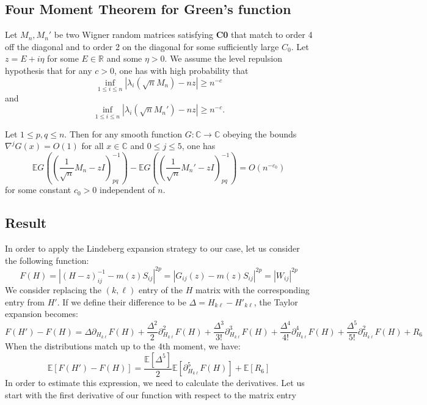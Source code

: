 \documentclass[11pt]{article}
\begin{document}
\subsection{Four Moment Theorem for Green's function}
 Let $M_n, M_n'$ be two Wigner random matrices satisfying \textbf{C0} that match to order 4 off the diagonal and to order 2 on the diagonal for some sufficiently large $C_0$. Let $z = E + i\eta$ for some $E \in \mathbb{R}$ and some $\eta > 0$. We assume the level repulsion hypothesis that for any $c > 0$, one has with high probability that
\begin{equation}
    \inf_{1 \leq i \leq n} |\lambda_i(\sqrt{n}M_n) - nz| \geq n^{-c}
\end{equation}
and
\begin{equation}
    \inf_{1 \leq i \leq n} |\lambda_i(\sqrt{n}M_n') - nz| \geq n^{-c}.
\end{equation}

Let $1 \leq p,q \leq n$. Then for any smooth function $G: \mathbb{C} \to \mathbb{C}$ obeying the bounds $\nabla^j G(x) = O(1)$ for all $x \in \mathbb{C}$ and $0 \leq j \leq 5$, one has
\begin{equation}
    \mathbb{E} G \left( \left( \frac{1}{\sqrt{n}} M_n - zI \right)^{-1}_{pq} \right)
    - \mathbb{E} G \left( \left( \frac{1}{\sqrt{n}} M_n' - zI \right)^{-1}_{pq} \right)
    = O(n^{-c_0})
\end{equation}
for some constant $c_0 > 0$ independent of $n$.



\subsection{Result}
In order to apply the Lindeberg expansion strategy to our case, let us consider the following function: $$F(H) = \left\vert
(H-z)_{ij}^{-1} - m(z)S_{ij}
\right\vert ^{2p} = \left\vert 
G_{ij}(z)-m(z)S_{ij}
\right\vert ^{2p} = |W_{ij}|^{2p}$$
We consider replacing the $(k, \ell)$ entry of the $H$ matrix with the corresponding entry from $H'$. If we define their difference to be $\Delta = H_{k\ell}-H'_{k\ell}$, the Taylor expansion becomes: $$F(H')-F(H) = \Delta \partial_{H_{k\ell}}F(H)  + \frac{\Delta^2}{2}\partial_{H_{k\ell}}^2F(H) +\frac{\Delta^3}{3!}\partial_{H_{k\ell}}^3F(H) +\frac{\Delta^4}{4!}\partial_{H_{k\ell}}^4F(H)+\frac{\Delta^5}{5!}\partial_{H_{k\ell}}^2F(H) +R_6$$
When the distributions match up to the 4th moment, we have: $$\mathbb{E}[F(H')-F(H)] = \frac{\mathbb{E}[\Delta^5]}{2}\mathbb{E}\left[\partial_{H_{k\ell}}^5F(H)\right] +\mathbb{E}[R_6]$$
In order to estimate this expression, we need to calculate the derivatives. Let us start with the first derivative of our function with respect to the matrix entry
\end{document}
